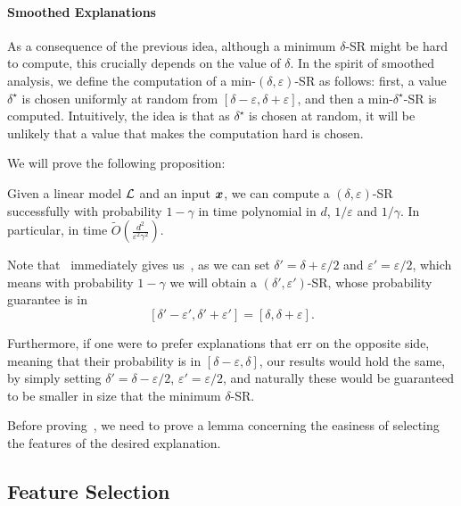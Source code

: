  \paragraph{Smoothed Explanations} As a consequence of the previous idea, although a minimum $\delta$-SR might be hard to compute, this crucially depends on the value of $\delta$. In the spirit of smoothed analysis, we define the computation of a min-$(\delta, \varepsilon)$-SR as follows: first, a value $\delta^\star$ is chosen uniformly at random from $[\delta-\varepsilon, \delta+\varepsilon]$, and then a min-$\delta^\star$-SR is computed. Intuitively, the idea is that as $\delta^\star$ is chosen at random, it will be unlikely that a value that makes the computation hard is chosen. 

 We will prove the following proposition:

\begin{proposition}
    \label{prop:smoothed-explanation}
    Given a linear model $\mathcal{L}$ and an input ${\bm{x}}$, we can compute a $(\delta, \varepsilon)$-SR successfully with probability $1 - \gamma$ in time polynomial in $d$, $1/\varepsilon$ and $1/\gamma$. In particular, in time $\tilde{O}\left( \frac{d^2}{\varepsilon^2\gamma^2}\right)$.
\end{proposition}

Note that~ immediately gives us~, as we can set $\delta' =  \delta+\varepsilon/2$ and $\varepsilon' = \varepsilon/2$, which means with probability $1 - \gamma$ we will obtain a $(\delta', \varepsilon')$-SR, whose probability guarantee is in 
\[
  [\delta' - \varepsilon', \delta' + \varepsilon'] =  [\delta, \delta + \varepsilon].
\]

Furthermore, if one were to prefer explanations that err on the opposite side, meaning that their probability is in $[\delta - \varepsilon, \delta]$, our results would hold the same, by simply setting $\delta' = \delta - \varepsilon/2$, $\varepsilon' = \varepsilon/2$, and naturally these would be guaranteed to be smaller in size that the minimum $\delta$-SR.

Before proving~, we need to prove a lemma concerning the easiness of selecting the features of the desired explanation.

\subsection{Feature Selection}

